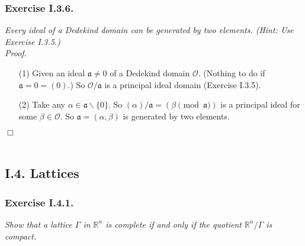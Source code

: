 \documentclass{article}
\begin{document}



\subsubsection*{Exercise I.3.6.}
\emph{Every ideal of a Dedekind domain can be generated by two elements.
(Hint: Use Exercise I.3.5.)} \\



\emph{Proof.}
\begin{enumerate}
\item[(1)]
  Given an ideal $\mathfrak{a} \neq 0$  of a Dedekind domain $\mathcal{O}$.
  (Nothing to do if $\mathfrak{a} = 0 = (0)$.)
  So $\mathcal{O}/\mathfrak{a}$ is a principal ideal domain (Exercise I.3.5).

\item[(2)]
  Take any $\alpha \in \mathfrak{a} \smallsetminus \{0\}$.
  So
  $(\alpha)/\mathfrak{a} = (\beta \pmod{\mathfrak{a}})$ is a principal ideal
  for some $\beta \in \mathcal{O}$.
  So $\mathfrak{a} = (\alpha, \beta)$ is generated by two elements.
\end{enumerate}
$\Box$ \\\\






\subsection*{I.4. Lattices \\}






\subsubsection*{Exercise I.4.1.}
\emph{Show that a lattice $\Gamma$ in $\mathbb{R}^n$ is complete
if and only if the quotient $\mathbb{R}^n/\Gamma$ is compact.} \\
\end{document}
